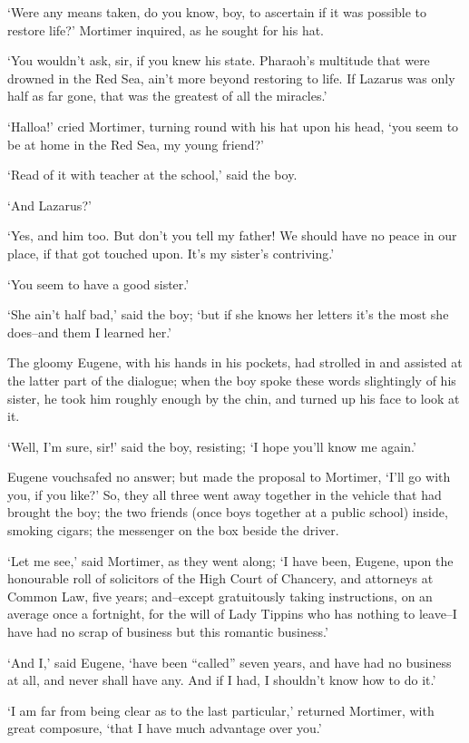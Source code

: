 ‘Were any means taken, do you know, boy, to ascertain if it was possible
to restore life?’ Mortimer inquired, as he sought for his hat.

‘You wouldn’t ask, sir, if you knew his state. Pharaoh’s multitude that
were drowned in the Red Sea, ain’t more beyond restoring to life. If
Lazarus was only half as far gone, that was the greatest of all the
miracles.’

‘Halloa!’ cried Mortimer, turning round with his hat upon his head, ‘you
seem to be at home in the Red Sea, my young friend?’

‘Read of it with teacher at the school,’ said the boy.

‘And Lazarus?’

‘Yes, and him too. But don’t you tell my father! We should have no peace
in our place, if that got touched upon. It’s my sister’s contriving.’

‘You seem to have a good sister.’

‘She ain’t half bad,’ said the boy; ‘but if she knows her letters it’s
the most she does--and them I learned her.’

The gloomy Eugene, with his hands in his pockets, had strolled in and
assisted at the latter part of the dialogue; when the boy spoke these
words slightingly of his sister, he took him roughly enough by the chin,
and turned up his face to look at it.

‘Well, I’m sure, sir!’ said the boy, resisting; ‘I hope you’ll know me
again.’

Eugene vouchsafed no answer; but made the proposal to Mortimer, ‘I’ll
go with you, if you like?’ So, they all three went away together in the
vehicle that had brought the boy; the two friends (once boys together at
a public school) inside, smoking cigars; the messenger on the box beside
the driver.

‘Let me see,’ said Mortimer, as they went along; ‘I have been, Eugene,
upon the honourable roll of solicitors of the High Court of Chancery,
and attorneys at Common Law, five years; and--except gratuitously taking
instructions, on an average once a fortnight, for the will of Lady
Tippins who has nothing to leave--I have had no scrap of business but
this romantic business.’

‘And I,’ said Eugene, ‘have been “called” seven years, and have had no
business at all, and never shall have any. And if I had, I shouldn’t
know how to do it.’

‘I am far from being clear as to the last particular,’ returned
Mortimer, with great composure, ‘that I have much advantage over you.’

